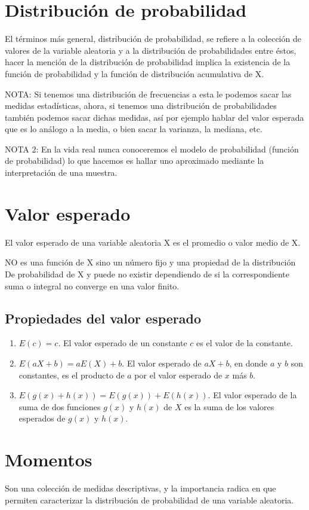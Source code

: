 \documentclass{book}
\begin{document}
\section{Distribución de probabilidad} 
El términos más general, distribución de probabilidad, se refiere a la colección de valores de la variable aleatoria y a la distribución de probabilidades entre éstos, hacer la mención de la distribución de probabilidad implica la existencia de la función de probabilidad y la función de distribución acumulativa de X.

NOTA: Si tenemos una distribución de frecuencias a esta le podemos sacar las medidas estadísticas, ahora, si tenemos una distribución de probabilidades también podemos  sacar dichas medidas, así por ejemplo hablar del valor esperada que es lo análogo a la media, o bien sacar la varianza, la mediana, etc.

NOTA 2: En la vida real nunca conoceremos el modelo de probabilidad (función de probabilidad) lo que hacemos es hallar uno aproximado mediante la interpretación de una muestra.

\section{Valor esperado}
El valor esperado de una variable aleatoria X es el promedio o valor medio de X. 

NO es una función de X sino un número fijo y una propiedad de la distribución De probabilidad de X y puede no existir dependiendo de si la correspondiente suma o integral no converge en una valor finito. 

\subsection{Propiedades del valor esperado}
\begin{enumerate}
    \item $E(c) = c$. El valor esperado de un constante $c$ es el valor de la constante.
    \item $E(aX+b)=aE(X)+b$. El valor esperado de $aX + b$, en donde $a$ y $b$ son constantes, es el producto de $a$ por el valor esperado de $x$ más $b$. 
    \item  $E(g(x)+h(x)) = E(g(x)) + E(h(x))$. El valor esperado de la suma de dos funciones $g(x)$ y $h(x)$ de $X$ es la suma de los valores esperados de $g(x)$ y $h(x)$.
\end{enumerate}


\section{Momentos} Son una colección de medidas descriptivas, y la importancia radica en que permiten caracterizar la distribución de probabilidad de una variable aleatoria.
\end{document}
